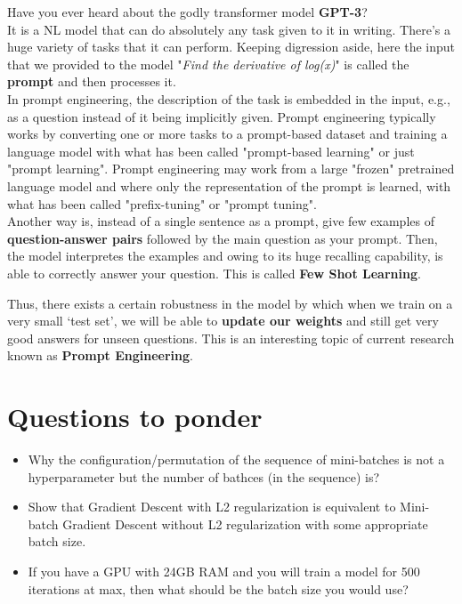 \documentclass[12pt]{article}
\begin{document}
Have you ever heard about the godly transformer model \textbf{GPT-3}?
\\
It is a NL model that can do absolutely any task given to it in writing.
There's a huge variety of tasks that it can perform. Keeping digression aside, here the input that we provided to the model "\textit{Find the derivative of log(x)}" is called the \textbf{prompt} and then processes it.
\\
In prompt engineering, the description of the task is embedded in the input, e.g., as a question instead of it being implicitly given. Prompt engineering typically works by converting one or more tasks to a prompt-based dataset and training a language model with what has been called "prompt-based learning" or just "prompt learning". Prompt engineering may work from a large "frozen" pretrained language model and where only the representation of the prompt is learned, with what has been called "prefix-tuning" or "prompt tuning".
\\
Another way is, instead of a single sentence as a prompt, give few examples of \textbf{question-answer pairs} followed by the main question as your prompt. Then, the model interpretes the examples and owing to its huge recalling capability, is able to correctly answer your question. This is called \textbf{Few Shot Learning}.


Thus, there exists a certain robustness in the model by which when we train on a very small `test set', we will be able to \textbf{update our weights} and still get very good answers for unseen questions. This is an interesting topic of current research known as \textbf{Prompt Engineering}. 



\section{Questions to ponder}
\begin{itemize}
    \item Why the configuration/permutation of the sequence of mini-batches is not a hyperparameter but the number of bathces (in the sequence) is?
    \item Show that Gradient Descent with L2 regularization is equivalent to Mini-batch Gradient Descent without L2 regularization with some appropriate batch size.
    \item If you have a GPU with 24GB RAM and you will train a model for 500 iterations at max, then what should be the batch size you would use?
\end{itemize}
\end{document}
